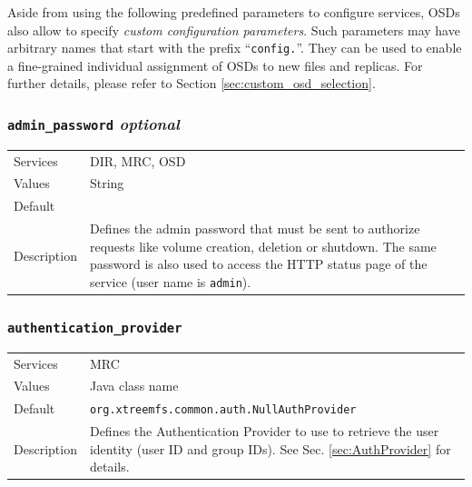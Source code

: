 \documentclass[a4paper,10pt]{book}
\begin{document}
Aside from using the following predefined parameters to configure services, OSDs also allow to specify \emph{custom configuration parameters}. Such parameters may have arbitrary names that start with the prefix ``\texttt{config.}''. They can be used to enable a fine-grained individual assignment of OSDs to new files and replicas. For further details, please refer to Section \ref{sec:custom_osd_selection}.


\subsubsection{\texttt{admin\_password} \textit{optional}}
\begin{tabular}{lp{10cm}}
 Services & DIR, MRC, OSD\\
 Values   & String \\
 Default  & \\
 Description & Defines the admin password that must be sent to authorize requests like volume creation, deletion or shutdown. The same password is also used to access the HTTP status page of the service (user name is \texttt{admin}).
\end{tabular}

\subsubsection{\texttt{authentication\_provider}}
\begin{tabular}{lp{10cm}}
 Services & MRC\\
 Values   & Java class name \\
 Default  & \texttt{org.xtreemfs.common.auth.NullAuthProvider}\\
 Description & Defines the Authentication Provider to use to retrieve the user identity (user ID and group IDs). See Sec. \ref{sec:AuthProvider} for details.
\end{tabular}
\end{document}
